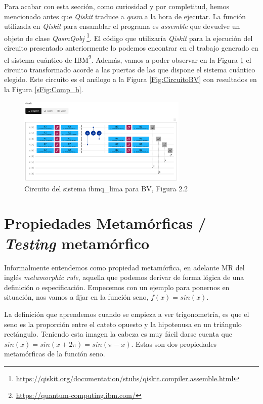 Para acabar con esta sección, como curiosidad y por completitud, hemos mencionado antes que \textit{Qiskit} traduce a \textit{qasm} a la hora de ejecutar. La función utilizada en \textit{Qiskit} para ensamblar el programa es \textit{assemble} que devuelve un objeto de clase \textit{QasmQobj} \footnote{\url{https://qiskit.org/documentation/stubs/qiskit.compiler.assemble.html}}. El código que utilizaría \textit{Qiskit} para la ejecución del circuito presentado anteriormente lo podemos encontrar en el trabajo generado en el sistema cuántico de IBM\footnote{\url{https://quantum-computing.ibm.com/}}. Además, vamos a poder observar en la Figura \ref{FIG:IBMCircBV} el circuito transformado acorde a las puertas de las que dispone el sistema cuántico elegido. Este circuito es el análogo a la Figura \ref{Fig:CircuitoBV} con resultados en la Figura \ref{sFig:Comp_b}.\newline

\begin{figure}[H]
    \centering
    \includegraphics[width=0.72\textwidth]{TFG/imagenes/IBMCircuitBV.png}
    \caption{Circuito del sistema ibmq\_lima para BV, Figura 2.2} 
    \label{FIG:IBMCircBV}
 \end{figure}


\section{Propiedades Metamórficas / \textit{Testing} metamórfico}
\label{Sec2.4:Metamorfico}

Informalmente entendemos como propiedad metamórfica, en adelante MR del inglés \textit{metamorphic rule}, aquella que podemos derivar de forma lógica de una definición o especificación. Empecemos con un ejemplo para ponernos en situación, nos vamos a fijar en la función seno, $f(x)=sin(x)$.\newline


La definición que aprendemos cuando se empieza a ver trigonometría, es que el seno es la proporción entre el cateto opuesto y la hipotenusa en un triángulo rectángulo. Teniendo esta imagen la cabeza es muy fácil darse cuenta que $sin(x)=sin(x + 2\pi)=sin(\pi-x)$. Estas son dos propiedades metamórficas de la función seno. \newline

